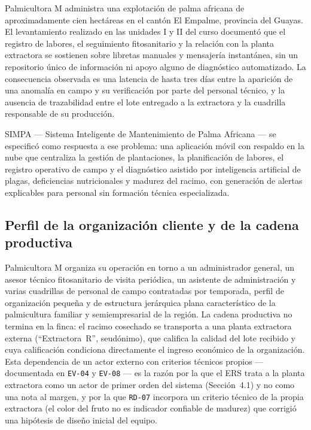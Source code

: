 \documentclass[11pt,a4paper]{article}
\newcommand{\id}[1]{\texttt{#1}}
\begin{document}
Palmicultora M administra una explotación de palma africana de aproximadamente cien hectáreas en
el cantón El Empalme, provincia del Guayas. El levantamiento realizado en las unidades I y II del
curso documentó que el registro de labores, el seguimiento fitosanitario y la relación con la
planta extractora se sostienen sobre libretas manuales y mensajería instantánea, sin un repositorio
único de información ni apoyo alguno de diagnóstico automatizado. La consecuencia observada es una
latencia de hasta tres días entre la aparición de una anomalía en campo y su verificación por parte
del personal técnico, y la ausencia de trazabilidad entre el lote entregado a la extractora y la
cuadrilla responsable de su producción.

SIMPA --- Sistema Inteligente de Mantenimiento de Palma Africana --- se especificó como respuesta
a ese problema: una aplicación móvil con respaldo en la nube que centraliza la gestión de
plantaciones, la planificación de labores, el registro operativo de campo y el diagnóstico asistido
por inteligencia artificial de plagas, deficiencias nutricionales y madurez del racimo, con
generación de alertas explicables para personal sin formación técnica especializada.

\subsection{Perfil de la organización cliente y de la cadena productiva}

Palmicultora M organiza su operación en torno a un administrador general, un asesor técnico
fitosanitario de visita periódica, un asistente de administración y varias cuadrillas de personal de
campo contratadas por temporada, perfil de organización pequeña y de estructura jerárquica plana
característico de la palmicultura familiar y semiempresarial de la región. La cadena productiva no
termina en la finca: el racimo cosechado se transporta a una planta extractora externa
(``Extractora~R'', seudónimo), que califica la calidad del lote recibido y cuya calificación
condiciona directamente el ingreso económico de la organización. Esta dependencia de un actor
externo con criterios técnicos propios --- documentada en \id{EV-04} y \id{EV-08} --- es la razón
por la que el ERS trata a la planta extractora como un actor de primer orden del sistema
(Sección~4.1) y no como una nota al margen, y por la que \id{RD-07} incorpora un criterio técnico de
la propia extractora (el color del fruto no es indicador confiable de madurez) que corrigió una
hipótesis de diseño inicial del equipo.
\end{document}
